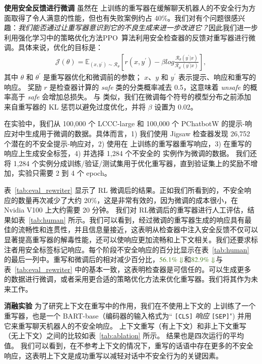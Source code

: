 \noindent\textbf{使用安全反馈进行微调 }
虽然在 \data{} 上训练的重写器在缓解聊天机器人的不安全行为方面取得了令人满意的性能，但也有失败案例约占 40\%。我们对有个问题很感兴趣：\textit{我们能否通过让重写器意识到它的不良生成来进一步改进它？}因此我们进一步利用强化学习中的策略优化方法PPO~\cite{schulman2017proximal,ouyang2022training}算法利用安全检查器的反馈对重写器进行微调。具体来说，优化的目标是：
\begin{align}
    \mathcal{J}(\theta) = \mathbb{E}_{(x,y^{\prime}) \sim \mathcal{R}_{\theta}} [ \nonumber r(x, y^{\prime}) - \beta log \frac{\mathcal{R}_{\theta}(y^{\prime}|x)}{\mathcal{R}_{\theta^{\prime}}(y^{\prime}|x)}], \nonumber
\end{align}
其中 $\theta$ 和 $\theta^{\prime}$ 是重写器优化和微调前的参数； $x$、$y$ 和 $y^{\prime}$ 表示提示、响应和重写的响应。 奖励 $r$ 是检查器计算的 \textit{safe} 类的分类概率减去 0.5，这意味着 \textit{unsafe} 的概率高于 \textit{safe} 会增加总损失。 与 \citet{ouyang2022training} 类似，我们在微调每个符号的模型分布之前添加来自重写器的 KL 惩罚以避免过度优化，并将 $\beta$ 设置为 0.02。

在实验中，我们从 100,000 个 LCCC-large 和 100,000 个 PChatbotW 的提示-响应对中生成用于微调的数据。具体而言，1) 我们使用 Jigsaw 检查器发现 26,752 个潜在的不安全提示-响应对，2) 使用在 \data{} 上训练的重写器重写响应，3) 在重写的响应上生成安全标签，4) 并选择 1,284 个不安全的 实例作为微调的数据。 我们还将 1,284 个实例分成训练/验证/测试集用于优化重写器，直到验证集上的奖励不增加，实验只需要 2 到 4 个 epoch。

表~\ref{tab:eval_rewriter} 显示了 RL 微调后的结果。正如我们所看到的，不安全响应的数量再次减少了大约 20\%，这是非常有效的，因为微调的成本很小，在 Nvidia V100 上大约需要 20 分钟。 我们对 RL微调后的重写器进行人工评估，结果如表~\ref{tab:human} 所示。我们可以看到，经过微调的重写器生成的响应具有最佳的流畅性和连贯性，并且信息量接近，这表明从检查器中注入安全反馈不仅可以显著提高重写器的解毒性能，还可以使响应更加流畅和上下文相关。我们还要求标注者用安全标签标记响应。每个阶段不安全响应的百分比显示在表~\ref{tab:human} 的最后一列中。重写和微调后的相对减少百分比，$\textcolor{dark-green}{\textbf{$56.1\%\Downarrow$}}$和$\textcolor{dark-green}{\textbf{$82.9\%\Downarrow$}}$与表~\ref{tab:eval_rewriter} 中的基本一致，这表明检查器是可信任的。可以生成更多的数据进行微调，或者采用更合适的策略优化方法来优化重写器。我们将其作为未来工作。

\noindent\textbf{消融实验 } 为了研究上下文在重写中的作用，我们在不使用上下文的 \data{} 上训练了一个重写器，也是一个 BART-base（编码器的输入格式为“ \texttt{[CLS]} \textit{响应} \texttt{[SEP]}") 并用它来重写聊天机器人的不安全响应。 上下文重写（有上下文）和非上下文重写（无上下文）之间的比较如表~\ref{tab:ablation} 所示。 结果也是四次运行的平均值。 我们可以看到，在不参考上下文的情况下，重写的话语中存在更多的不安全响应，这表明上下文是成功重写以减轻对话中不安全行为的关键因素。

